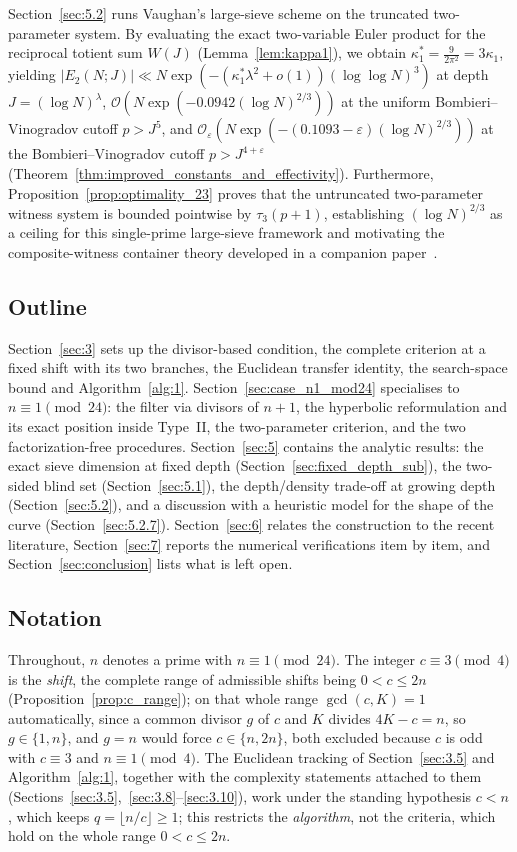 \documentclass[11pt, a4paper]{article}
\theoremstyle{plain}
\theoremstyle{definition}
\begin{document}
Section~\ref{sec:5.2} runs Vaughan's large-sieve scheme on the truncated two-parameter system. By evaluating the exact two-variable Euler product for the reciprocal totient sum $W(J)$ (Lemma~\ref{lem:kappa1}), we obtain $\kappa_1^{\ast}=\frac{9}{2\pi^{2}}=3\kappa_1$, yielding $|E_2(N;J)|\ll N\exp(-(\kappa_1^{\ast}\lambda^{2}+o(1))(\log\log N)^{3})$ at depth $J=(\log N)^{\lambda}$, $\mathcal{O}(N\exp(-0.0942(\log N)^{2/3}))$ at the uniform Bombieri--Vinogradov cutoff $p>J^{5}$, and $\mathcal{O}_\varepsilon(N\exp(-(0.1093-\varepsilon)(\log N)^{2/3}))$ at the Bombieri--Vinogradov cutoff $p>J^{4+\varepsilon}$ (Theorem~\ref{thm:improved_constants_and_effectivity}). Furthermore, Proposition~\ref{prop:optimality_23} proves that the untruncated two-parameter witness system is bounded pointwise by $\tau_3(p+1)$, establishing $(\log N)^{2/3}$ as a ceiling for this single-prime large-sieve framework and motivating the composite-witness container theory developed in a companion paper~\cite{dahan2026b}.

\subsection{Outline} \label{sec:outline}
Section~\ref{sec:3} sets up the divisor-based condition, the complete criterion at a fixed shift with its two branches, the Euclidean transfer identity, the search-space bound and Algorithm~\ref{alg:1}. Section~\ref{sec:case_n1_mod24} specialises to $n\equiv1\pmod{24}$: the filter via divisors of $n+1$, the hyperbolic reformulation and its exact position inside Type~II, the two-parameter criterion, and the two factorization-free procedures. Section~\ref{sec:5} contains the analytic results: the exact sieve dimension at fixed depth (Section~\ref{sec:fixed_depth_sub}), the two-sided blind set (Section~\ref{sec:5.1}), the depth/density trade-off at growing depth (Section~\ref{sec:5.2}), and a discussion with a heuristic model for the shape of the curve (Section~\ref{sec:5.2.7}). Section~\ref{sec:6} relates the construction to the recent literature, Section~\ref{sec:7} reports the numerical verifications item by item, and Section~\ref{sec:conclusion} lists what is left open.

\subsection{Notation} \label{sec:notation}
Throughout, $n$ denotes a prime with $n\equiv1\pmod{24}$. The integer $c\equiv3\pmod4$ is the \emph{shift}, the complete range of admissible shifts being $0<c\le2n$ (Proposition~\ref{prop:c_range}); on that whole range $\gcd(c,K)=1$ automatically, since a common divisor $g$ of $c$ and $K$ divides $4K-c=n$, so $g\in\{1,n\}$, and $g=n$ would force $c\in\{n,2n\}$, both excluded because $c$ is odd with $c\equiv3$ and $n\equiv1\pmod4$. The Euclidean tracking of Section~\ref{sec:3.5} and Algorithm~\ref{alg:1}, together with the complexity statements attached to them (Sections~\ref{sec:3.5},~\ref{sec:3.8}--\ref{sec:3.10}), work under the standing hypothesis $c<n$, which keeps $q=\lfloor n/c\rfloor\ge1$; this restricts the \emph{algorithm}, not the criteria, which hold on the whole range $0<c\le2n$.
\end{document}
